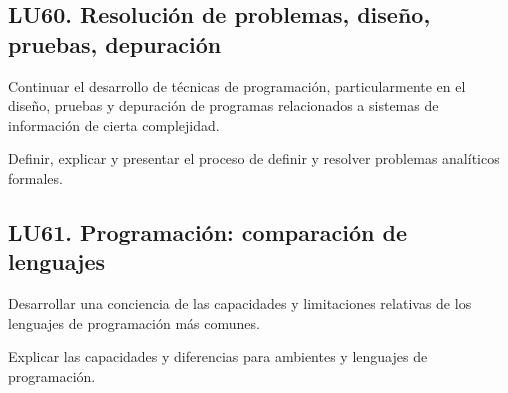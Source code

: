\subsection{LU60. Resolución de problemas, diseño, pruebas, depuración}\label{sec:BOK-LU60}\label{sec:LU60}
\begin{LearningUnit}
\begin{LUGoal}
\item Continuar el desarrollo de técnicas de programación, particularmente en el diseño, pruebas y depuración de programas relacionados a sistemas de información de cierta complejidad.
\end{LUGoal}

\begin{LUObjective}
\item Definir, explicar y presentar el proceso de definir y resolver problemas analíticos formales.
\end{LUObjective}
\end{LearningUnit}

\subsection{LU61. Programación: comparación de lenguajes}\label{sec:BOK-LU61}\label{sec:LU61}
\begin{LearningUnit}
\begin{LUGoal}
\item Desarrollar una conciencia de las capacidades y limitaciones relativas de los lenguajes de programación más comunes.
\end{LUGoal}

\begin{LUObjective}
\item Explicar las capacidades y diferencias para ambientes y lenguajes de programación.
\end{LUObjective}
\end{LearningUnit}

